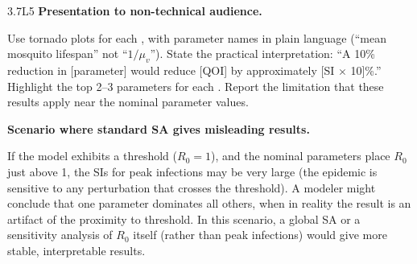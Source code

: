 \begin{solution}{3.7}{L5}
 \textbf{Presentation to non-technical audience.}

Use tornado plots for each \QOI, with parameter names in plain language
(``mean mosquito lifespan'' not ``$1/\mu_v$''). State the practical
interpretation: ``A 10\% reduction in [parameter] would reduce [QOI]
by approximately [SI $\times$ 10]\%.'' Highlight the top 2--3 parameters
for each \QOI. Report the limitation that these results apply near the
nominal parameter values.

 \textbf{Scenario where standard SA gives misleading results.}

If the model exhibits a threshold ($R_0 = 1$), and the nominal
parameters place $R_0$ just above 1, the SIs for peak infections
may be very large (the epidemic is sensitive to any perturbation
that crosses the threshold). A modeler might conclude that one
parameter dominates all others, when in reality the result is
an artifact of the proximity to threshold. In this scenario,
a global SA or a sensitivity analysis of $R_0$ itself
(rather than peak infections) would give more stable, interpretable results.


\end{solution}


